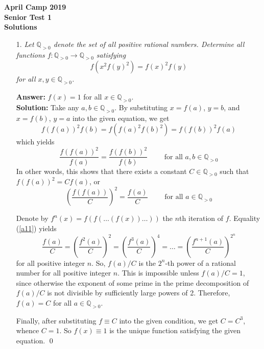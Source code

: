\documentclass[a4paper, 12pt]{article}
\begin{document}
\begin{center}
\textbf{April Camp 2019 \\ Senior Test 1} \\
\textbf{Solutions}
\end{center}
\vspace{5mm}

\begin{enumerate}

\item[1.]  \textit{Let $\mathbb{Q}_{> 0}$ denote the set of all positive rational numbers. Determine all functions $f: \mathbb{Q}_{> 0} \to \mathbb{Q}_{> 0}$ satisfying
$$
f \left( x^2 f(y)^2\right) = f(x)^2 f(y) $$
for all $x, y \in \mathbb{Q}_{> 0}$.}
\vspace{5mm}

\textbf{Answer:} $f(x) = 1$ for all $x \in \mathbb{Q}_{> 0}$. \\

\textbf{Solution:} Take any $a, b \in \mathbb{Q}_{> 0}$. By substituting $x = f(a)$, $y = b$, and $x = f(b)$, $y = a$ into the given equation, we get
$$ f(f(a))^2 f(b) = f(f(a)^2 f(b)^2 ) = f(f(b))^2 f(a) $$
which yields
$$
\frac{f(f(a))^2}{f(a)} = \frac{f(f(b))^2}{f(b)} \qquad \textrm{ for all } a, b \in \mathbb{Q}_{> 0}
$$
In other words, this shows that there exists a constant $C \in \mathbb{Q}_{> 0}$ such that $f(f(a))^2 = C f(a)$, or
\begin{equation}  \label{a11}
    \left( \frac{f(f(a))}{C}  \right)^2 = \frac{f(a)}{C} \qquad \textrm{ for all } a \in \mathbb{Q}_{> 0}
\end{equation}

Denote by $f^n(x) = f(f(\dots(f(x))\dots))$ the $n$th iteration of $f$. Equality (\ref{a11}) yields
$$
\frac{f(a)}{C} = \left( \frac{f^2(a)}{C}  \right)^2 = \left( \frac{f^3(a)}{C}  \right)^4 = \dots = \left( \frac{f^{n+1}(a)}{C}  \right)^{2^n}
$$
for all positive integer $n$. So, $f(a)/C$ is the $2^n$-th power of a rational number for all positive integer $n$. This is impossible unless $f(a)/C = 1$, since otherwise the exponent of some prime in the prime decomposition of $f(a)/C$ is not divisible by sufficiently large powers of 2. Therefore, $f(a) = C$ for all $a \in \mathbb{Q}_{> 0}$.

Finally, after substituting $f \equiv C$ into the given condition, we get $C = C^3$, whence $C = 1$. So $f(x) \equiv 1$ is the unique function satisfying the given equation.
\qed \\


\end{enumerate}
\end{document}

